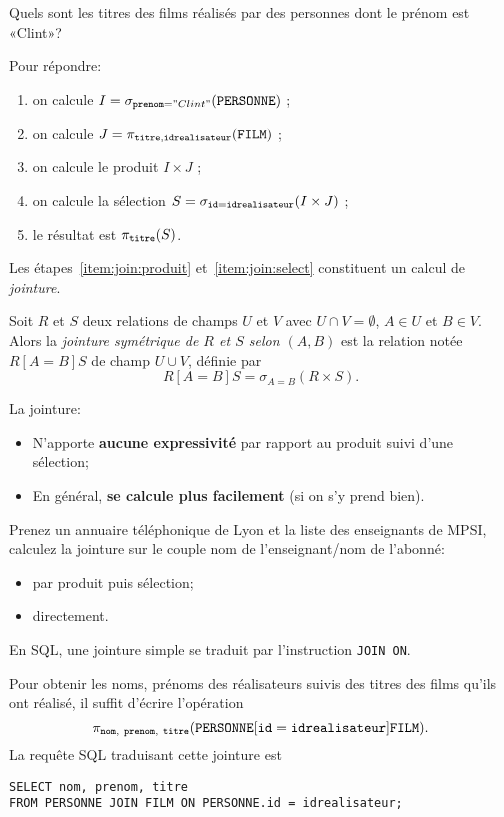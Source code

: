Quels sont les titres des films réalisés par des personnes dont le prénom est
«Clint»?

Pour répondre:
\begin{enumerate}
\item on calcule $I=\sigma_{\mathtt{prenom}="Clint"}(\mathtt{PERSONNE})$ ;
\item on calcule $J=\pi_{\mathtt{titre}, \mathtt{idrealisateur}}(\mathtt{FILM})$ ;
\item\label{item:join:produit}on calcule le produit $I\times J$ ;
\item\label{item:join:select}on calcule la sélection
  $S=\sigma_{\mathtt{id}=\mathtt{idrealisateur}}(I\times J)$ ;
\item le résultat est $\pi_{\mathtt{titre}}(S)$.
\end{enumerate}

Les étapes~\ref{item:join:produit} et~\ref{item:join:select}
constituent un calcul de \emph{jointure}.
\begin{defi}[Jointure]
  Soit $R$ et $S$ deux relations de champs $U$ et $V$ avec
  $U\cap V = \emptyset$, $A\in U$ et $B\in V$.
  Alors
  la \emph{jointure symétrique de $R$ et $S$ selon $(A,B)$} est la
  relation notée $R[A=B]S$ de
  champ $U\cup V$, définie par
  \begin{equation*}
    R[A=B] S = \sigma_{A=B}(R\times S).
  \end{equation*}
\end{defi}

La jointure:
\begin{itemize}
\item N'apporte \textbf{aucune expressivité} par rapport au produit suivi d'une
  sélection;
\item En général, \textbf{se calcule plus facilement} (si on s'y prend
  bien).
\end{itemize}

\begin{exemple}
  Prenez un annuaire téléphonique de Lyon et la liste des
enseignants de MPSI, calculez la jointure sur le couple nom de
l'enseignant/nom de l'abonné:
\begin{itemize}
\item par produit puis sélection;
\item directement.
\end{itemize}
\end{exemple}

En SQL, une jointure simple se traduit par l'instruction \texttt{JOIN ON}.
\begin{exemple}
Pour obtenir les noms, prénoms des réalisateurs suivis des titres des films qu'ils ont réalisé, il suffit d'écrire l'opération
\begin{equation*}
  \pi_{\ttnom,\ \ttprenom,\ \tttitre}(\PERSONNE[\ttid = \ttidr] \FILM).
\end{equation*}
La requête SQL traduisant cette jointure est 
\begin{verbatim}
SELECT nom, prenom, titre
FROM PERSONNE JOIN FILM ON PERSONNE.id = idrealisateur;
\end{verbatim}

\end{exemple}

